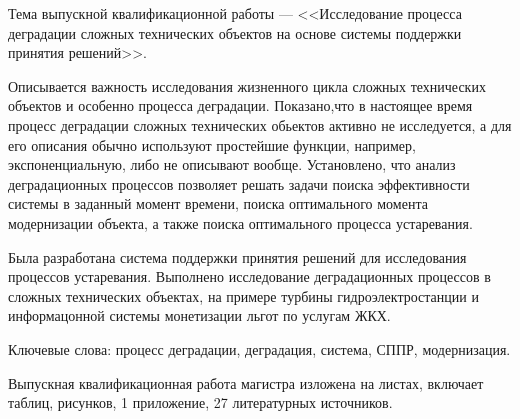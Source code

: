 
Тема выпускной квалификационной работы --- <<Исследование процесса деградации сложных технических объектов на основе системы поддержки принятия решений>>.

Описывается важность исследования жизненного цикла сложных технических объектов и особенно процесса деградации.
Показано,что в настоящее время процесс деградации сложных технических обьектов активно не исследуется, 
а для его описания обычно используют простейшие функции, например, экспоненциальную, либо не описывают вообще.
Установлено,  что анализ деградационных процессов позволяет решать задачи поиска эффективности системы в заданный момент времени, поиска оптимального момента модернизации объекта,
а также поиска оптимального процесса устаревания.

Была разработана система поддержки принятия решений для исследования процессов устаревания.
Выполнено исследование деградационных процессов в сложных технических объектах, на примере турбины гидроэлектростанции и информацонной системы монетизации льгот по услугам ЖКХ.

Ключевые слова: процесс деградации, деградация, система, СППР, модернизация.

Выпускная квалификационная работа магистра изложена на \pageref{LastPage} листах, включает \totaltables таблиц, 
\totalfigures рисунков, 1 приложение, 27 литературных источников.

\clearpage
